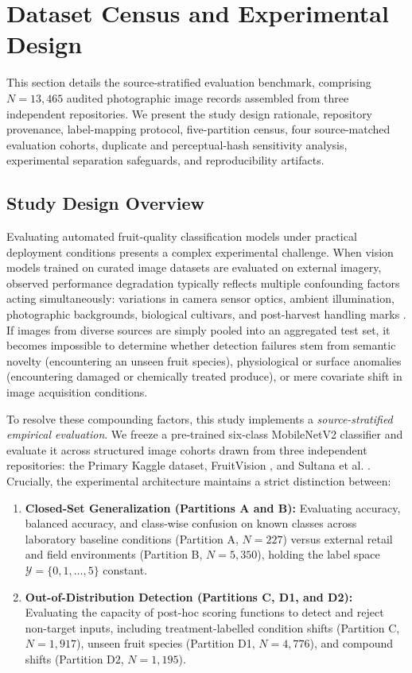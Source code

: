 \section{Dataset Census and Experimental Design}
\label{sec:dataset_design}

This section details the source-stratified evaluation benchmark, comprising $N = 13,465$ audited photographic image records assembled from three independent repositories. We present the study design rationale, repository provenance, label-mapping protocol, five-partition census, four source-matched evaluation cohorts, duplicate and perceptual-hash sensitivity analysis, experimental separation safeguards, and reproducibility artifacts.

\subsection{Study Design Overview}
\label{sec:study_design_overview}

Evaluating automated fruit-quality classification models under practical deployment conditions presents a complex experimental challenge. When vision models trained on curated image datasets are evaluated on external imagery, observed performance degradation typically reflects multiple confounding factors acting simultaneously: variations in camera sensor optics, ambient illumination, photographic backgrounds, biological cultivars, and post-harvest handling marks \cite{abayomi2024fruitq,sultana2022extensive,bijoy2025fruitvision}. If images from diverse sources are simply pooled into an aggregated test set, it becomes impossible to determine whether detection failures stem from semantic novelty (encountering an unseen fruit species), physiological or surface anomalies (encountering damaged or chemically treated produce), or mere covariate shift in image acquisition conditions.

To resolve these compounding factors, this study implements a \textit{source-stratified empirical evaluation}. We freeze a pre-trained six-class MobileNetV2 classifier \cite{sandler2018mobilenetv2} and evaluate it across structured image cohorts drawn from three independent repositories: the Primary Kaggle dataset, FruitVision \cite{bijoy2025fruitvision}, and Sultana et al. \cite{sultana2022extensive}. Crucially, the experimental architecture maintains a strict distinction between:
\begin{enumerate}
\item \textbf{Closed-Set Generalization (Partitions A and B):} Evaluating accuracy, balanced accuracy, and class-wise confusion on known classes across laboratory baseline conditions (Partition A, $N = 227$) versus external retail and field environments (Partition B, $N = 5,350$), holding the label space $\mathcal{Y} = \{0, 1, \dots, 5\}$ constant.
\item \textbf{Out-of-Distribution Detection (Partitions C, D1, and D2):} Evaluating the capacity of post-hoc scoring functions to detect and reject non-target inputs, including treatment-labelled condition shifts (Partition C, $N = 1,917$), unseen fruit species (Partition D1, $N = 4,776$), and compound shifts (Partition D2, $N = 1,195$).
\end{enumerate}

